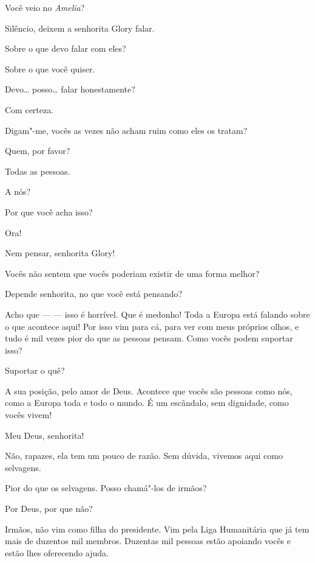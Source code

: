  Você veio no \textit{Amelia}?

 Silêncio, deixem a senhorita Glory falar.

  Sobre o que devo falar com eles?

  Sobre o que você quiser.

 Devo\ldots{} posso\ldots{} falar honestamente?

 Com certeza.

  Digam"-me, vocês as vezes não acham ruim como eles os tratam?

 Quem, por favor?

 Todas as pessoas.

 A nós?

 Por que você acha isso?

 Ora!

 Nem pensar, senhorita Glory!

 Vocês não sentem que vocês poderiam existir de uma forma melhor?

 Depende senhorita, no que você está pensando?

 Acho que ---  --- isso é horrível. Que é medonho!
 Toda a Europa está falando sobre o que acontece aqui! 
Por isso vim para cá, para ver com meus próprios olhos, e
tudo é mil vezes pior do que as pessoas pensam. Como vocês podem suportar isso?

 Suportar o quê?

 A sua posição, pelo amor de Deus. Acontece que vocês são pessoas
como nós, como a Europa toda e todo o mundo. É um escândalo, sem dignidade, como
vocês vivem!

 Meu Deus, senhorita!

 Não, rapazes, ela tem um pouco de razão. Sem dúvida, vivemos aqui como selvagens.

 Pior do que os selvagens. Posso chamá"-los de irmãos?

 Por Deus, por que não?

 Irmãos, não vim como filha do presidente. Vim pela Liga Humanitária que
já tem mais de duzentos mil membros. Duzentas mil pessoas estão apoiando vocês e
estão lhes oferecendo ajuda. 


